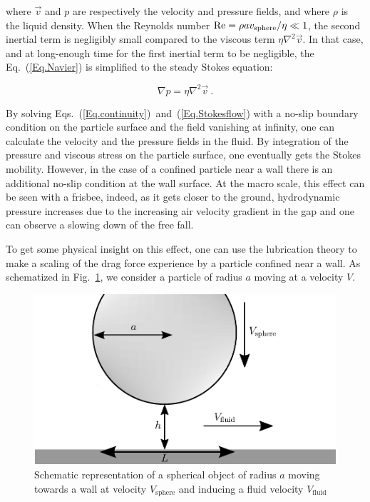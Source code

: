 where $\vec{v}$ and $p$ are respectively the velocity and pressure fields, and where $\rho$ is the liquid density. When the Reynolds number $\textnormal{Re} = \rho a v_\mathrm{sphere} / \eta \ll 1$,  the second inertial term is negligibly small compared to the viscous term $\eta \nabla ^2 \vec{v}$. In that case, and at long-enough time for the first inertial term to be negligible, the Eq.~(\ref{Eq.Navier}) is simplified to the steady Stokes equation:

\begin{equation}
	\nabla p = \eta \nabla ^2 \vec{v}~.
	\label{Eq.Stokesflow}
\end{equation}

By solving Eqs.~(\ref{Eq.continuity})~and~(\ref{Eq.Stokesflow}) with a no-slip boundary condition on the particle surface and the field vanishing at infinity, one can calculate the velocity and the pressure fields in the fluid. By integration of the pressure and viscous stress on the particle surface, one eventually gets the Stokes mobility. However, in the case of a confined particle near a wall there is an additional no-slip condition at the wall surface. At the macro scale, this effect can be seen with a frisbee, indeed, as it gets closer to the ground, hydrodynamic pressure increases due to the increasing air velocity gradient in the gap and one can observe a slowing down of the free fall.

To get some physical insight on this effect, one can use the lubrication theory to make a scaling of the drag force experience by a particle confined near a wall. As schematized in Fig.~\ref{fig.shear}, we consider a particle of radius $a$ moving at a velocity $V$. 

\begin{figure}[ht]
	\centering
	\includegraphics{02_body/chapter3/images/draw_shear/shear.pdf}
	\caption{Schematic representation of a spherical object of radius $a$ moving towards a wall at velocity $V_\mathrm{sphere}$ and inducing a fluid velocity $V_\mathrm{fluid}$} 
	\label{fig.shear}
\end{figure}

